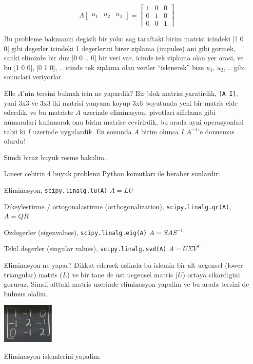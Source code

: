 \documentclass[12pt,fleqn]{article}
\begin{document}
\[ 
A 
\left[\begin{array}{rrr}
u_1 & u_2 & u_3
\end{array}\right]
=
\left[\begin{array}{rrr}
1 & 0 & 0\\
0 & 1 & 0\\
0 & 0 & 1
\end{array}\right]
 \]

Bu probleme bakmanin degisik bir yolu: sag taraftaki birim matrisi icindeki
[1 0 0] gibi degerler icindeki 1 degerlerini birer ziplama (impulse) ani
gibi gormek, sanki elimizde bir duz [0 0 .. 0] bir veri var, icinde tek
ziplama olan yer orasi, ve bu [1 0 0], [0 1 0], .. icinde tek ziplama olan
veriler ``islenerek'' bize $u_1$, $u_2$, .. gibi sonuclari veriyorlar. 

Elle $A$'nin tersini bulmak icin ne yapardik? Bir blok matrisi yaratirdik,
\verb![A I]!, yani 3x3 ve 3x3 iki matrisi yanyana koyup 3x6 boyutunda yeni
bir matris elde ederdik, ve bu matriste $A$ uzerinde eliminasyon, pivotlari
sifirlama gibi numaralari kullanarak onu birim matrise cevirirdik, bu arada
ayni operasyonlari tabii ki $I$ uzerinde uygulardik. En sonunda $A$ birim
olunca $I$ $A^{-1}$'e donusmus olurdu!

Simdi biraz buyuk resme bakalim. 

Lineer cebirin 4 buyuk problemi Python komutlari ile beraber sunlardir:

Eliminasyon, 
\verb!scipy.linalg.lu(A)! $A = LU$

Dikeylestirme / ortogonalastirme (orthogonalization), 
\verb!scipy.linalg.qr(A)!, $A = QR$

Ozdegerler (eigenvalues), 
\verb!scipy.linalg.eig(A)! $A = SAS^{-1}$

Tekil degerler (singular values), 
\verb!scipy.linalg.svd(A)! $A = U \Sigma V^{T}$

Eliminasyon ne yapar? Dikkat edersek aslinda bu islemin bir alt ucgensel
(lower triangular) matris ($L$) ve bir tane de ust ucgensel matris ($U$)
ortaya cikardigini goruruz. Simdi alttaki matris uzerinde eliminasyon
yapalim ve bu arada tersini de bulmus olalim. 

\includegraphics[height=2cm]{3_2.png}

Eliminasyon islemlerini yapalim. 
\end{document}
